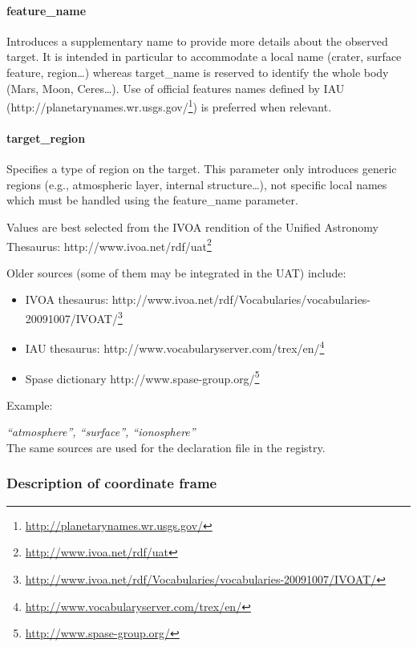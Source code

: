 \documentclass[11pt,a4paper]{ivoa}
\begin{document}
\paragraph{feature\_name}

Introduces a supplementary name to provide more details about the observed target. It is intended in particular to accommodate a local name (crater, surface feature, region…) whereas target\_name is reserved to identify the whole body (Mars, Moon, Ceres…). Use of official features names defined by IAU (http://planetarynames.wr.usgs.gov/\footnote{\url{http://planetarynames.wr.usgs.gov/}}) is preferred when relevant.

\paragraph{target\_region}

Specifies a type of region on the target. This parameter only introduces generic regions  (e.g., atmospheric layer, internal structure…), not specific local names which must be handled using the feature\_name parameter.

Values are best selected from the IVOA rendition of the Unified Astronomy Thesaurus: http://www.ivoa.net/rdf/uat\footnote{\url{http://www.ivoa.net/rdf/uat}}

Older sources (some of them may be integrated in the UAT) include:

\begin{itemize}

\item IVOA thesaurus: http://www.ivoa.net/rdf/Vocabularies/vocabularies-20091007/IVOAT/\footnote{\url{http://www.ivoa.net/rdf/Vocabularies/vocabularies-20091007/IVOAT/}}

\item IAU thesaurus: http://www.vocabularyserver.com/trex/en/\footnote{\url{http://www.vocabularyserver.com/trex/en/}}

\item Spase dictionary http://www.spase-group.org/\footnote{\url{http://www.spase-group.org/}}

\end{itemize}


Example: 

\emph{``atmosphere'', ``surface'', ``ionosphere''}\\The same sources are used for the declaration file in the registry.

\subsubsection{Description of coordinate frame}
\end{document}
